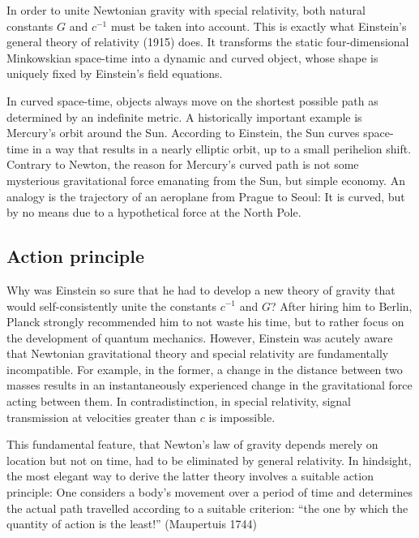 
\newpage {}
\label{sec:1100}

In order to unite Newtonian gravity with special relativity, both natural constants $G$ and $c^{−1}$ must be taken into account. This is exactly what Einstein's general theory of relativity (1915) does. It transforms the static four-dimensional Minkowskian space-time into a dynamic and curved object, whose shape is uniquely fixed by Einstein's field equations.

In curved space-time, objects always move on the shortest possible path as determined by an indefinite metric. A historically important example is Mercury's orbit around the Sun. According to Einstein, the Sun curves space-time in a way that results in a nearly elliptic orbit, up to a small perihelion shift. Contrary to Newton, the reason for Mercury's curved path is not some mysterious gravitational force emanating from the Sun, but simple economy. An analogy is the trajectory of an aeroplane from Prague to Seoul: It is curved, but by no means due to a hypothetical force at the North Pole.


\subsection*{Action principle}

Why was Einstein so sure that he had to develop a new theory of gravity that would self-consistently unite the constants $c^{−1}$ and $G$? After hiring him to Berlin, Planck strongly recommended him to not waste his time, but to rather focus on the development of quantum mechanics. However, Einstein was acutely aware that Newtonian gravitational theory and special relativity are fundamentally incompatible. For example, in the former, a change in the distance between two masses results in an instantaneously experienced change in the gravitational force acting between them. In contradistinction, in special relativity, signal transmission at velocities greater than $c$ is impossible.

This fundamental feature, that Newton's law of gravity depends merely on location but not on time, had to be eliminated by general relativity. In hindsight, the most elegant way to derive the latter theory involves a suitable action principle: One considers a body's movement over a period of time and determines the actual path travelled according to a suitable criterion: \enquote{the one by which the quantity of action is the least!} (Maupertuis 1744)


